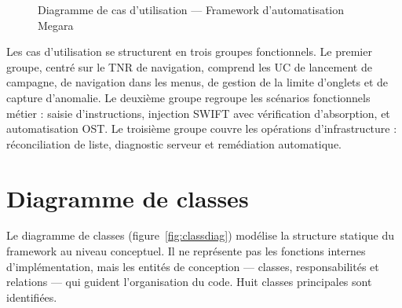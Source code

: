 \documentclass[12pt, a4paper]{report}
\begin{document}
\begin{figure}[H]
{%
}
\caption{Diagramme de cas d'utilisation — Framework d'automatisation Megara}
\label{fig:usecase}
\end{figure}

Les cas d'utilisation se structurent en trois groupes fonctionnels. Le premier groupe, centré sur le TNR de navigation, comprend les UC de lancement de campagne, de navigation dans les menus, de gestion de la limite d'onglets et de capture d'anomalie. Le deuxième groupe regroupe les scénarios fonctionnels métier : saisie d'instructions, injection SWIFT avec vérification d'absorption, et automatisation OST. Le troisième groupe couvre les opérations d'infrastructure : réconciliation de liste, diagnostic serveur et remédiation automatique.

\section{Diagramme de classes}

Le diagramme de classes (figure~\ref{fig:classdiag}) modélise la structure statique du framework au niveau conceptuel. Il ne représente pas les fonctions internes d'implémentation, mais les entités de conception — classes, responsabilités et relations — qui guident l'organisation du code. Huit classes principales sont identifiées.
\end{document}
